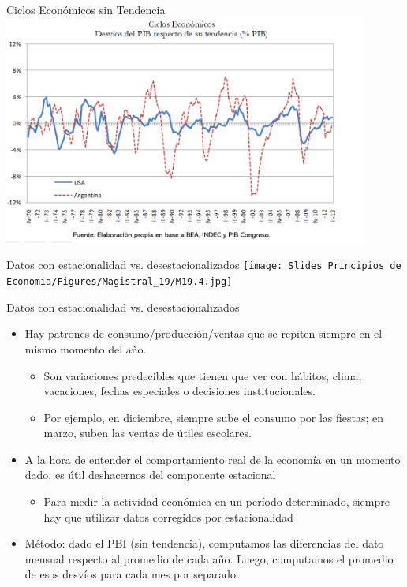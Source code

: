 \documentclass{beamer}
\begin{document}
\begin{frame}{Ciclos Económicos sin Tendencia}
\centering
\includegraphics[width=12cm]{Slides Principios de Economia/Figures/P12.png}\
\end{frame}


\begin{frame}{Datos con estacionalidad vs. desestacionalizados}
\centering\texttt{[image: Slides Principios de Economia/Figures/Magistral\_19/M19.4.jpg]}
\end{frame}

\begin{frame}{Datos con estacionalidad vs. desestacionalizados}
    \begin{itemize}
        \item Hay patrones de consumo/producción/ventas que se repiten siempre en el mismo momento del año.
            \begin{itemize}
            \item Son variaciones predecibles que tienen que ver con hábitos, clima, vacaciones, fechas especiales o decisiones institucionales.
            \item Por ejemplo, en diciembre, siempre sube el consumo por las fiestas; en marzo, suben las ventas de útiles escolares.
            \end{itemize} \vspace{1mm}
        \item A la hora de entender el comportamiento real de la economía en un momento dado, es útil deshacernos del componente estacional
        \begin{itemize}
            \item Para medir la actividad económica en un período determinado, siempre hay que utilizar datos corregidos por estacionalidad
            \end{itemize} \vspace{1mm}
        \item Método: dado el PBI (sin tendencia), computamos las diferencias del dato mensual respecto al promedio de cada año. Luego, computamos el promedio de esos desvíos para cada mes por separado. 
    \end{itemize}
\end{frame}
\end{document}
